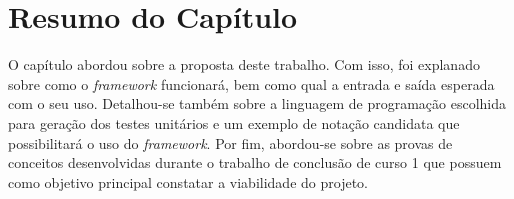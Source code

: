 \section{Resumo do Capítulo}
O capítulo abordou sobre a proposta deste trabalho. Com isso, foi explanado sobre como o \textit{framework} funcionará, bem como qual a entrada e saída esperada com o seu uso. Detalhou-se também sobre a linguagem de programação escolhida para geração dos testes unitários e um exemplo de notação candidata que possibilitará o uso do \textit{framework}. Por fim, abordou-se sobre as provas de conceitos desenvolvidas durante o trabalho de conclusão de curso 1 que possuem como objetivo principal constatar a viabilidade do projeto. 

 